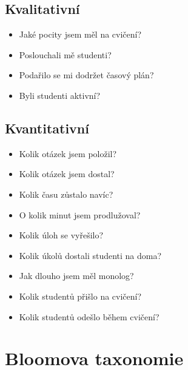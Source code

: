 \documentclass[twoside,openany,10pt]{book}
\begin{document}
\section*{Kvalitativní}
\begin{itemize}
\item Jaké pocity jsem měl na cvičení?
\item Poslouchali mě studenti?
\item Podařilo se mi dodržet časový plán?
\item Byli studenti aktivní?
\end{itemize}

\section*{Kvantitativní}
\begin{itemize}
\item Kolik otázek jsem položil?
\item Kolik otázek jsem dostal?
\item Kolik času zůstalo navíc?
\item O kolik minut jsem prodlužoval?
\item Kolik úloh se vyřešilo?
\item Kolik úkolů dostali studenti na doma?
\item Jak dlouho jsem měl monolog?
\item Kolik studentů přišlo na cvičení?
\item Kolik studentů odešlo během cvičení?
\end{itemize}
\newpage

\chapter*{Bloomova taxonomie}
\label{bloom}
\end{document}
